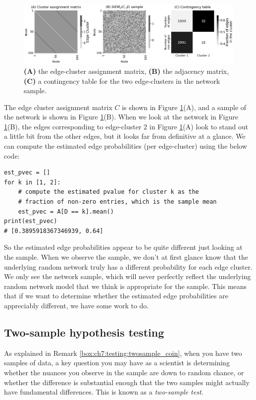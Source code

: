 \begin{figure}
    \centering
    \includegraphics[width=\linewidth]{applications/ch7/Images/testing_siem_ex.png}
    \caption{\textbf{(A)} the edge-cluster assignment matrix, \textbf{(B)} the adjacency matrix, \textbf{(C)} a contingency table for the two edge-clusters in the network sample.}
    \label{fig:ch7:testing:siem_ex}
\end{figure}
The edge cluster assignment matrix $C$ is shown in Figure \ref{fig:ch7:testing:siem_ex}(A), and a sample of the network is shown in Figure \ref{fig:ch7:testing:siem_ex}(B). When we look at the network in Figure \ref{fig:ch7:testing:siem_ex}(B), the edges corresponding to edge-cluster $2$ in Figure \ref{fig:ch7:testing:siem_ex}(A) look to stand out a little bit from the other edges, but it looks far from definitive at a glance. We can compute the estimated edge probabilities (per edge-cluster) using the below code:

\begin{lstlisting}[style=python]
est_pvec = []
for k in [1, 2]:
    # compute the estimated pvalue for cluster k as the 
    # fraction of non-zero entries, which is the sample mean
    est_pvec = A[D == k].mean()
print(est_pvec)
# [0.3895918367346939, 0.64]
\end{lstlisting}
So the estimated edge probabilities appear to be quite different just looking at the sample. When we observe the sample, we don't at first glance know that the underlying random network truly has a different probability for each edge cluster. We only see the network sample, which will never perfectly reflect the underlying random network model that we think is appropriate for the sample. This means that if we want to determine whether the estimated edge probabilities are appreciably different, we have some work to do.

\subsection{Two-sample hypothesis testing}

As explained in Remark \ref{box:ch7:testing:twosample_coin}, when you have two samples of data, a key question you may have as a scientist is determining whether the nuances you observe in the sample are down to random chance, or whether the difference is substantial enough that the two samples might actually have fundamental differences. This is known as a \textit{two-sample test}.

